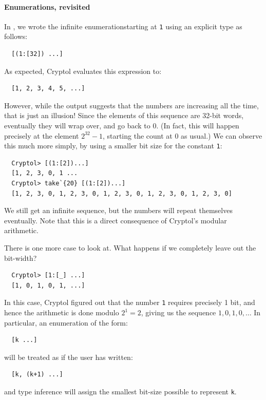 \paragraph*{Enumerations, revisited} In
, we wrote the infinite
enumeration{\indEnum\indInfSeq}starting at {\tt 1} using an explicit
type as follows:
\begin{Verbatim}
  [(1:[32]) ...]
\end{Verbatim}
As expected, Cryptol evaluates this expression to:
\begin{Verbatim}
  [1, 2, 3, 4, 5, ...]
\end{Verbatim}
However, while the output suggests that the numbers are increasing all
the time, that is just an illusion! Since the elements of this
sequence are 32-bit words, eventually they will wrap over, and go back
to 0. (In fact, this will happen precisely at the element $2^{32}-1$,
starting the count at 0 as usual.) We can observe this much more
simply, by using a smaller bit size for the constant {\tt 1}:
\begin{Verbatim}
  Cryptol> [(1:[2])...]
  [1, 2, 3, 0, 1 ...
  Cryptol> take`{20} [(1:[2])...]
  [1, 2, 3, 0, 1, 2, 3, 0, 1, 2, 3, 0, 1, 2, 3, 0, 1, 2, 3, 0]
\end{Verbatim}
We still get an infinite sequence, but the numbers will repeat
themselves eventually. Note that this is a direct consequence of
Cryptol's modular arithmetic.\indModular


There is one more case to look at. What happens if we completely leave
out the bit-width?
\begin{Verbatim}
  Cryptol> [1:[_] ...]
  [1, 0, 1, 0, 1, ...]
\end{Verbatim}
In this case, Cryptol figured out that the number {\tt 1} requires
precisely 1 bit, and hence the arithmetic is done modulo $2^1 = 2$,
giving us the sequence $1,0,1,0,\ldots$ In particular, an
enumeration of the form:
\begin{Verbatim}
  [k ...]
\end{Verbatim}
will be treated as if the user has written:
\begin{Verbatim}
  [k, (k+1) ...]
\end{Verbatim}
and type inference will assign the smallest bit-size possible to
represent {\tt k}.

